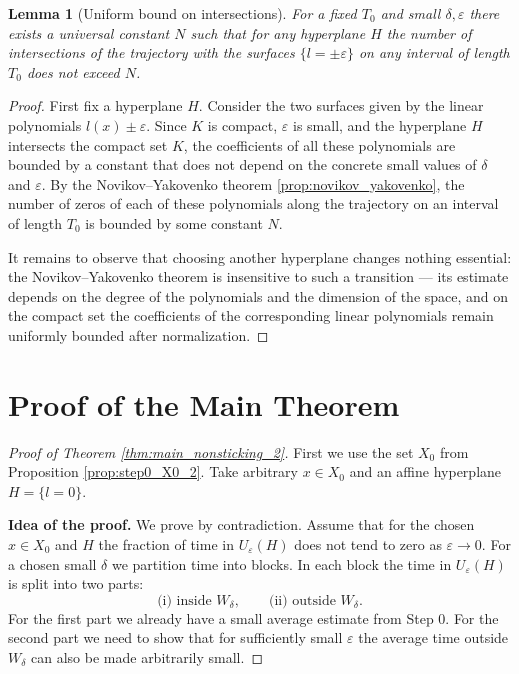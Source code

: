 \documentclass[11pt]{article}
\newcommand{\eps}{\varepsilon}
\theoremstyle{thmstyleone}
\newtheorem{lemma}[theorem]{Lemma}
\theoremstyle{thmstyletwo}
\theoremstyle{thmstylethree}
\begin{document}
\begin{appendices}
\begin{lemma}[Uniform bound on intersections]
For a fixed $T_0$ and small $\delta,\eps$ there exists a universal constant $N$ such that for any hyperplane $H$ the number of intersections of the trajectory with the surfaces $\{l=\pm\eps\}$ on any interval of length $T_0$ does not exceed $N$.
\end{lemma}

\begin{proof}
First fix a hyperplane $H$. Consider the two surfaces given by the linear polynomials $l(x)\pm\eps$. Since $K$ is compact, $\eps$ is small, and the hyperplane $H$ intersects the compact set $K$, the coefficients of all these polynomials are bounded by a constant that does not depend on the concrete small values of $\delta$ and $\eps$. By the Novikov–Yakovenko theorem \ref{prop:novikov_yakovenko}, the number of zeros of each of these polynomials along the trajectory on an interval of length $T_0$ is bounded by some constant $N$.

It remains to observe that choosing another hyperplane changes nothing essential: the Novikov–Yakovenko theorem is insensitive to such a transition — its estimate depends on the degree of the polynomials and the dimension of the space, and on the compact set the coefficients of the corresponding linear polynomials remain uniformly bounded after normalization.
\end{proof}

\section{Proof of the Main Theorem}
\label{app:proof_main_theorem_2}



\begin{proof}[Proof of Theorem \ref{thm:main_nonsticking_2}]
First we use the set $X_0$ from Proposition \ref{prop:step0_X0_2}. Take arbitrary $x\in X_0$ and an affine hyperplane $H=\{l=0\}$.

\textbf{Idea of the proof.}
We prove by contradiction. Assume that for the chosen $x\in X_0$ and $H$ the fraction of time in $U_\eps(H)$ does not tend to zero as $\eps\to0$. For a chosen small $\delta$ we partition time into blocks. In each block the time in $U_\eps(H)$ is split into two parts:
\[
    \text{(i) inside }W_\delta,
    \qquad
    \text{(ii) outside }W_\delta.
\]
For the first part we already have a small average estimate from Step 0. For the second part we need to show that for sufficiently small $\eps$ the average time outside $W_\delta$ can also be made arbitrarily small.


\end{proof}
\end{appendices}
\end{document}
